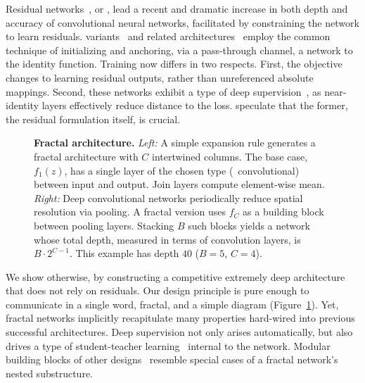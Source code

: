 Residual networks~\citep{he2015deep}, or {\resnets}, lead a recent and dramatic
increase in both depth and accuracy of convolutional neural networks,
facilitated by constraining the network to learn residuals.  {\Resnet}
variants~\citep{he2015deep,he2016identity,huang2016stochasticdepth} and related
architectures~\citep{srivastava2015highway} employ the common technique of
initializing and anchoring, via a pass-through channel, a network to the
identity function.  Training now differs in two respects.  First, the objective
changes to learning residual outputs, rather than unreferenced absolute
mappings.  Second, these networks exhibit a type of deep supervision~\citep{
lee2014deeply}, as near-identity layers effectively reduce distance to the
loss.  \cite{he2015deep} speculate that the former, the residual formulation
itself, is crucial.

\begin{figure}[ht]
   \begin{center}
      
   \end{center}
   \vspace{-0.02\linewidth}
   \caption{
      \textbf{Fractal architecture.}
      \emph{Left:}
         A simple expansion rule generates a fractal architecture with $C$
         intertwined columns.  The base case, $f_1(z)$, has a single layer
         of the chosen type (\eg~convolutional) between input and output.
         Join layers compute element-wise mean.
      \emph{Right:}
         Deep convolutional networks periodically reduce spatial resolution
         via pooling.  A fractal version uses $f_C$ as a building block
         between pooling layers.  Stacking $B$ such blocks yields a network
         whose total depth, measured in terms of convolution layers, is
         $B \cdot 2^{C-1}$.  This example has depth $40$ ($B=5$, $C=4$).
   }
   \label{fig:fractalnet}
\end{figure}

We show otherwise, by constructing a competitive extremely deep architecture
that does not rely on residuals.  Our design principle is pure enough to
communicate in a single word, fractal, and a simple diagram
(Figure~\ref{fig:fractalnet}).  Yet, fractal networks implicitly recapitulate
many properties hard-wired into previous successful architectures.  Deep
supervision not only arises automatically, but also drives a type of
student-teacher learning~\citep{ba2014dodeep,urban2016dodeepsfollowup} internal
to the network.  Modular building blocks of other designs~\citep{
szegedy2015inception,liao2015competitive} resemble special cases of a fractal
network's nested substructure.

